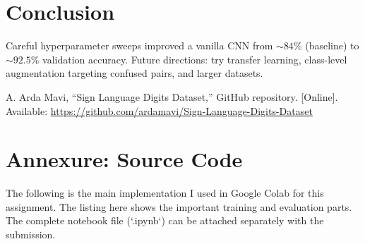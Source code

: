 \documentclass[conference]{IEEEtran}
\begin{document}
\section{Conclusion}
Careful hyperparameter sweeps improved a vanilla CNN from \(\sim84\%\) (baseline) to \(\sim92.5\%\) validation accuracy. Future directions: try transfer learning, class-level augmentation targeting confused pairs, and larger datasets.

\begin{thebibliography}{00}
 A. Arda Mavi, ``Sign Language Digits Dataset,'' GitHub repository. [Online]. Available: \url{https://github.com/ardamavi/Sign-Language-Digits-Dataset}
\end{thebibliography}

\onecolumn
\appendices
\section{Annexure: Source Code}
The following is the main implementation I used in Google Colab for this assignment.  
The listing here shows the important training and evaluation parts.  
The complete notebook file (`.ipynb`) can be attached separately with the submission.
\end{document}
